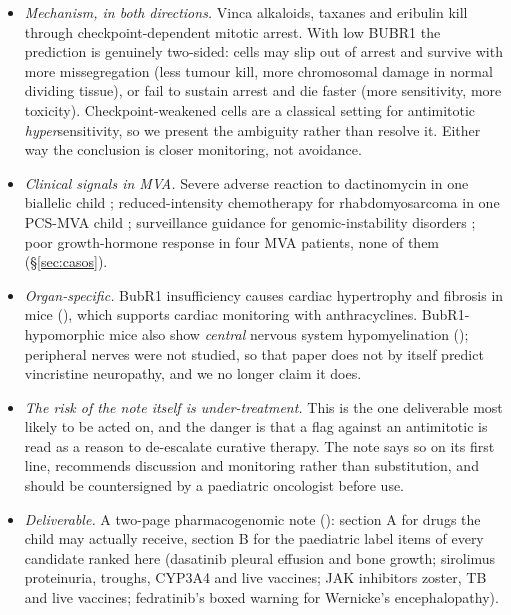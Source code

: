 \documentclass[10pt]{article}
\begin{document}
\begin{keybox}[title={S1 · Safety note (tier 0)}]
\begin{itemize}
\item \textit{Mechanism, in both directions.} Vinca alkaloids, taxanes and eribulin kill through
  checkpoint-dependent mitotic arrest. With low BUBR1 the prediction is genuinely two-sided: cells may slip out of
  arrest and survive with more missegregation (less tumour kill, more chromosomal damage in normal dividing tissue),
  or fail to sustain arrest and die faster (more sensitivity, more toxicity). Checkpoint-weakened cells are a
  classical setting for antimitotic \emph{hyper}sensitivity, so we present the ambiguity rather than resolve it.
  Either way the conclusion is closer monitoring, not avoidance.
\item \textit{Clinical signals in MVA.} Severe adverse reaction to dactinomycin in one biallelic  child
  \citep{ochiai}; reduced-intensity chemotherapy for rhabdomyosarcoma in one PCS-MVA child \citep{nishitani};
  surveillance guidance for genomic-instability disorders \citep{nakano}; poor growth-hormone response in four MVA
  patients, none of them  (§\ref{sec:casos}).
\item \textit{Organ-specific.} BubR1 insufficiency causes cardiac hypertrophy and fibrosis in mice
  (), which supports cardiac monitoring with anthracyclines. BubR1-hypomorphic mice also show
  \emph{central} nervous system hypomyelination (); peripheral nerves were not studied, so that paper
  does not by itself predict vincristine neuropathy, and we no longer claim it does.
\item \textit{The risk of the note itself is under-treatment.} This is the one deliverable most likely to be acted
  on, and the danger is that a flag against an antimitotic is read as a reason to de-escalate curative therapy. The
  note says so on its first line, recommends discussion and monitoring rather than substitution, and should be
  countersigned by a paediatric oncologist before use.
\item \textit{Deliverable.} A two-page pharmacogenomic note (): section A for drugs the child
  may actually receive, section B for the paediatric label items of every candidate ranked here (dasatinib pleural
  effusion and bone growth; sirolimus proteinuria, troughs, CYP3A4 and live vaccines; JAK inhibitors zoster, TB and
  live vaccines; fedratinib's boxed warning for Wernicke's encephalopathy).
\end{itemize}
\end{keybox}
\end{document}
